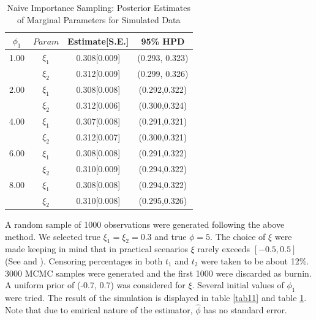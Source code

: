 \documentclass[11pt]{article}
\theoremstyle{remboldstyle}
\begin{document}
\begin{table}[H]
\caption{Naive Importance Sampling: Posterior Estimates of Marginal Parameters for Simulated Data}
\centering
\begin{tabular}{c c c c}
\hline
$\phi_{1}$ & $Param$      & Estimate[S.E.] & 95\% HPD\\
\hline      
1.00        & $\xi_1$      & 0.308[0.009]        & (0.293, 0.323)\\   
              & $\xi_2$      & 0.312[0.009]        & (0.299, 0.326)\\
              \hline 
2.00      & $\xi_1$      & 0.308[0.008]        & (0.292,0.322)\\   
              & $\xi_2$      & 0.312[0.006]        & (0.300,0.324)\\
              \hline
4.00     & $\xi_1$      & 0.307[0.008]        & (0.291,0.321)\\   
              & $\xi_2$      & 0.312[0.007]        & (0.300,0.321)\\
              \hline
6.00        & $\xi_1$      & 0.308[0.008]        & (0.291,0.322)\\   
              & $\xi_2$      & 0.310[0.009]        & (0.294,0.322)\\
              \hline
8.00       & $\xi_1$      & 0.308[0.008]        & (0.294,0.322)\\   
              & $\xi_2$      & 0.310[0.008]        & (0.295,0.326)\\
              \hline             
\end{tabular}
\label{tab1}
\end{table}
\noindent
A random sample of 1000 observations were generated following the above method. We selected true $\xi_1 = \xi_2 = 0.3$ and true $\phi = 5$. The choice of $\xi$ were made keeping in mind that in practical scenarios $\xi$ rarely exceeds $[-0.5, 0.5]$ (See \cite{castillo:1997} and \cite{smith:1985}).  Censoring percentages in both $t_1$ and $t_2$ were taken to be about 12\%. 3000 MCMC samples were generated and the first 1000 were discarded as burnin. A uniform prior of (-0.7, 0.7) was considered for $\xi$.  Several initial values of $\phi_1$ were tried. The result of the simulation is displayed in table \ref{tab11} and table \ref{tab1}. Note that due to emirical nature of the estimator, $\hat{\phi}$ has no standard error.
\end{document}
